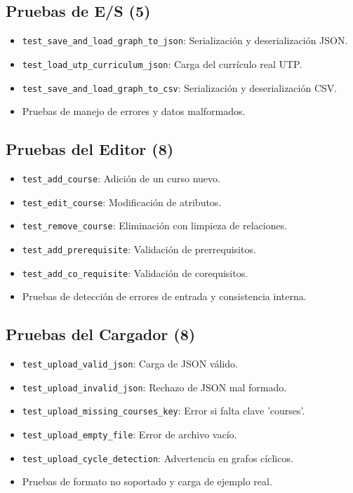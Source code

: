 \documentclass[12pt]{report}
\begin{document}
\subsection{Pruebas de E/S (5)}
\begin{itemize}
    \item \texttt{test\_save\_and\_load\_graph\_to\_json}: Serialización y deserialización JSON.
    \item \texttt{test\_load\_utp\_curriculum\_json}: Carga del currículo real UTP.
    \item \texttt{test\_save\_and\_load\_graph\_to\_csv}: Serialización y deserialización CSV.
    \item Pruebas de manejo de errores y datos malformados.
\end{itemize}

\subsection{Pruebas del Editor (8)}
\begin{itemize}
    \item \texttt{test\_add\_course}: Adición de un curso nuevo.
    \item \texttt{test\_edit\_course}: Modificación de atributos.
    \item \texttt{test\_remove\_course}: Eliminación con limpieza de relaciones.
    \item \texttt{test\_add\_prerequisite}: Validación de prerrequisitos.
    \item \texttt{test\_add\_co\_requisite}: Validación de corequisitos.
    \item Pruebas de detección de errores de entrada y consistencia interna.
\end{itemize}

\subsection{Pruebas del Cargador (8)}
\begin{itemize}
    \item \texttt{test\_upload\_valid\_json}: Carga de JSON válido.
    \item \texttt{test\_upload\_invalid\_json}: Rechazo de JSON mal formado.
    \item \texttt{test\_upload\_missing\_courses\_key}: Error si falta clave 'courses'.
    \item \texttt{test\_upload\_empty\_file}: Error de archivo vacío.
    \item \texttt{test\_upload\_cycle\_detection}: Advertencia en grafos cíclicos.
    \item Pruebas de formato no soportado y carga de ejemplo real.
\end{itemize}
\end{document}
